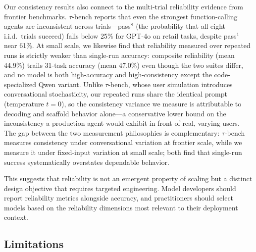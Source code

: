 Our consistency results also connect to the multi-trial reliability evidence from frontier benchmarks. $\tau$-bench \cite{yao2024tau} reports that even the strongest function-calling agents are inconsistent across trials---pass$^8$ (the probability that all eight i.i.d.\ trials succeed) falls below 25\% for GPT-4o on retail tasks, despite pass$^1$ near 61\%. At small scale, we likewise find that reliability measured over repeated runs is strictly weaker than single-run accuracy: composite reliability (mean 44.9\%) trails 31-task accuracy (mean 47.0\%) even though the two suites differ, and no model is both high-accuracy and high-consistency except the code-specialized Qwen variant. Unlike $\tau$-bench, whose user simulation introduces conversational stochasticity, our repeated runs share the identical prompt (temperature $t = 0$), so the consistency variance we measure is attributable to decoding and scaffold behavior alone---a conservative lower bound on the inconsistency a production agent would exhibit in front of real, varying users. The gap between the two measurement philosophies is complementary: $\tau$-bench measures consistency under conversational variation at frontier scale, while we measure it under fixed-input variation at small scale; both find that single-run success systematically overstates dependable behavior.

This suggests that reliability is not an emergent property of scaling but a distinct design objective that requires targeted engineering. Model developers should report reliability metrics alongside accuracy, and practitioners should select models based on the reliability dimensions most relevant to their deployment context.

\subsection{Limitations}
\label{sec:limitations}

